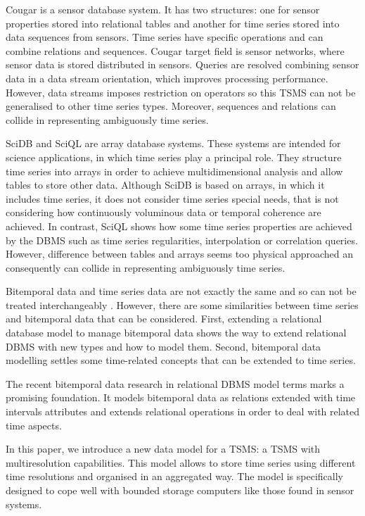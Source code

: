 Cougar \cite{bonnet01} is a sensor database system. It has two
structures: one for sensor properties stored into relational tables
and another for time series stored into data sequences from
sensors. Time series have specific operations and can combine
relations and sequences. Cougar target field is sensor networks, where
sensor data is stored distributed in sensors. Queries are resolved
combining sensor data in a data stream orientation, which improves
processing performance. However, data streams imposes restriction on
operators so this TSMS can not be generalised to other time series
types. Moreover, sequences and relations can collide in representing
ambiguously time series.


SciDB \cite{stonebraker09:scidb} and SciQL \cite{zhang11} are array
database systems. These systems are intended for science applications,
in which time series play a principal role. They structure time series
into arrays in order to achieve multidimensional analysis and allow
tables to store other data.  Although SciDB is based on arrays, in
which it includes time series, it does not consider time series
special needs, that is not considering how continuously voluminous
data or temporal coherence are achieved.  In contrast, SciQL shows how
some time series properties are achieved by the DBMS such as time
series regularities, interpolation or correlation queries.  However,
difference between tables and arrays seems too physical approached an
consequently can collide in representing ambiguously time series.


Bitemporal data and time series data are not exactly the same and so
can not be treated interchangeably \cite{schmidt95}. However, there
are some similarities between time series and bitemporal data that can
be considered. First, extending a relational database model to manage
bitemporal data shows the way to extend relational DBMS with new types
and how to model them. Second, bitemporal data modelling settles some
time-related concepts that can be extended to time series.

The recent bitemporal data research in relational DBMS model terms
\cite{date02:_tempor_data_relat_model} marks a promising
foundation. It models bitemporal data as relations extended with time
intervals attributes and extends relational operations in order to
deal with related time aspects.





In this paper, we introduce a new data model for a TSMS: a TSMS with
multiresolution capabilities. This model allows to store time series
using different time resolutions and organised in an aggregated way. The
model is specifically designed to cope well with bounded storage
computers like those found in sensor systems.

